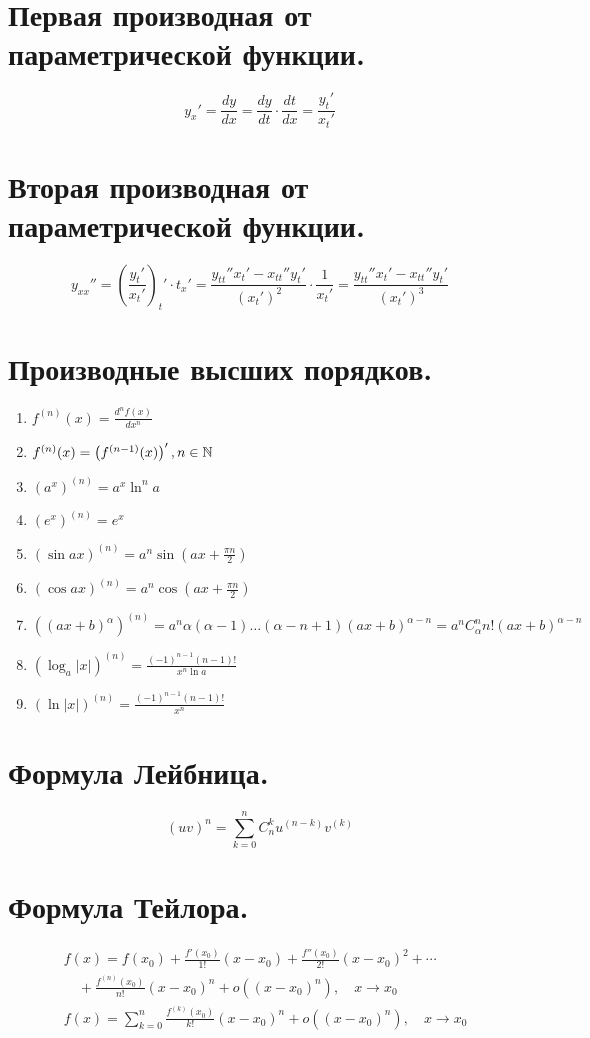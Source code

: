 \documentclass[a4paper,14pt]{article}
\begin{document}
    \section{Первая производная от параметрической функции.}
    \[y_x'=\frac{dy}{dx}=\frac{dy}{dt}\cdot \frac{dt}{dx}=\frac{y_t'}{x_t'}\]
    \section{Вторая производная от параметрической функции.}
    \[y_{xx}''=\left(\frac{y_t'}{x_t'}\right)_t'\cdot t_x'=\frac{y_{tt}''x_t'-x_{tt}''y_t'}{(x_t')^2}\cdot \frac{1}{x_t'}=\frac{y_{tt}''x_t'-x_{tt}''y_t'}{(x_t')^3}\]
    \section{Производные высших порядков.}
    \begin{enumerate}
        \item $f^{(n)}(x)=\frac{d^nf(x)}{dx^n}$
        \item $f^{(n)}(x)=\left(f^{(n-1)}(x)\right)', n\in \mathbb{N}$
        \item $(a^x)^{(n)}=a^x \ln^n a$
        \item $(e^x)^{(n)}=e^x$
        \item $\left(\sin ax\right)^{(n)}=a^n\sin(ax+\frac{\pi n}{2})$
        \item $\left(\cos ax\right)^{(n)}=a^n\cos(ax+\frac{\pi n}{2})$
        \item $\left((ax+b)^\alpha\right)^{(n)}=a^n\alpha(\alpha-1)\dots(\alpha-n+1)(ax+b)^{\alpha-n}=a^nC_\alpha ^n n!(ax+b)^{\alpha-n}$
        \item $\left(\log_a |x|\right)^{(n)}=\frac{(-1)^{n-1}(n-1)!}{x^n\ln a}$
        \item $\left(\ln |x|\right)^{(n)}=\frac{(-1)^{n-1}(n-1)!}{x^n}$
    \end{enumerate}
    \section{Формула Лейбница.}
    \[(uv)^n=\sum_{k=0}^n C_n^k u^{(n-k)}v^{(k)}\]
    \section{Формула Тейлора.}
    \begin{align}
        &f(x) = f(x_0) + \frac{f'(x_0)}{1!}(x - x_0) + \frac{f''(x_0)}{2!}(x - x_0)^2 + \cdots \nonumber \\
        &\quad + \frac{f^{(n)}(x_0)}{n!}(x - x_0)^n + o\left((x - x_0)^n\right), \quad x \rightarrow x_0 \nonumber\\
        &f(x)=\sum_{k=0}^{n} \frac{f^{(k)}(x_0)}{k!}(x-x_0)^n+ o\left((x - x_0)^n\right), \quad x \rightarrow x_0
    \end{align}
\end{document}
